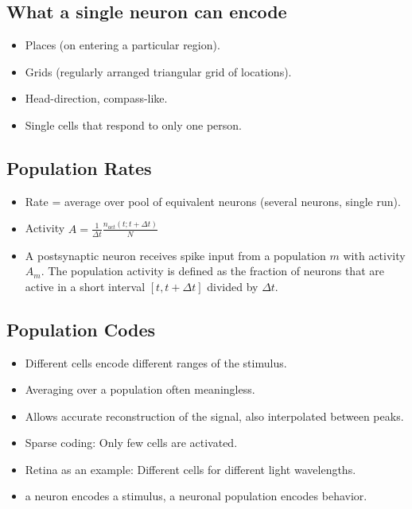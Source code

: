 \documentclass[main]{subfiles}
\begin{document}
\subsection{What a single neuron can encode}
\begin{itemize}[noitemsep,nolistsep]
	\item Places (on entering a particular region).
	\item Grids (regularly arranged triangular grid of locations).
	\item Head-direction, compass-like.
	\item Single cells that respond to only one person.
\end{itemize}

\subsection{Population Rates}
\begin{itemize}[noitemsep,nolistsep]
	\item Rate = average over pool of equivalent neurons (several neurons, single run).
	\item Activity $A=\frac{1}{\Delta t}\frac{n_{act}(t;t+\Delta t)}{N}$
	\item A postsynaptic neuron receives spike input from a population $m$ with activity $A_m$. The population activity is defined as the fraction of neurons that are active in a short interval $[t,t+\Delta t]$ divided by $\Delta t$.
\end{itemize}

\subsection{Population Codes}
\begin{itemize}[noitemsep,nolistsep]
	\item Different cells encode different ranges of the stimulus.
	\item Averaging over a population often meaningless.
	\item Allows accurate reconstruction of the signal, also interpolated between peaks.
	\item Sparse coding: Only few cells are activated.
	\item Retina as an example: Different cells for different light wavelengths.
	\item a neuron encodes a stimulus, a neuronal population encodes behavior.
\end{itemize}
\end{document}
